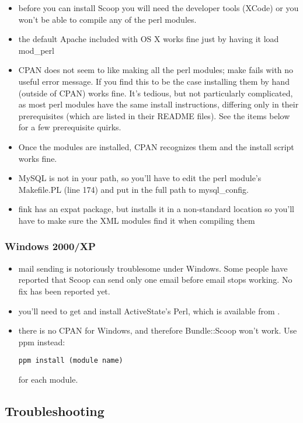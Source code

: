 \begin{itemize}
\item before you can install Scoop you will need the developer tools (XCode) or you won't be able to compile any of the perl modules.
\item the default Apache included with OS X works fine just by having it load mod\_perl
\item CPAN does not seem to like making all the perl modules; make fails with no useful error message. If you find this to be the case installing them by hand (outside of CPAN) works fine. It's tedious, but not particularly complicated, as most perl modules have the same install instructions, differing only in their prerequisites (which are listed in their README files). See the items below for a few prerequisite quirks.
\item Once the modules are installed, CPAN recognizes them and the install script works fine.
\item MySQL is not in your path, so you'll have to edit the perl module's Makefile.PL (line 174) and put in the full path to mysql\_config.
\item fink has an expat package, but installs it in a non-standard location so you'll have to make sure the XML modules find it when compiling them
\end{itemize}

\subsubsection{Windows 2000/XP}

\begin{itemize}
\item mail sending is notoriously troublesome under Windows.  Some people have reported that Scoop can send only one email before email stops working. No fix has been reported yet.
\item you'll need to get and install ActiveState's Perl, which is available from .
\item there is no CPAN for Windows, and therefore Bundle::Scoop won't work. Use ppm instead:
\begin{verbatim}
ppm install (module name)
\end{verbatim}
for each module.
\end{itemize}

\subsection{Troubleshooting}
\label{install-troubleshooting}


